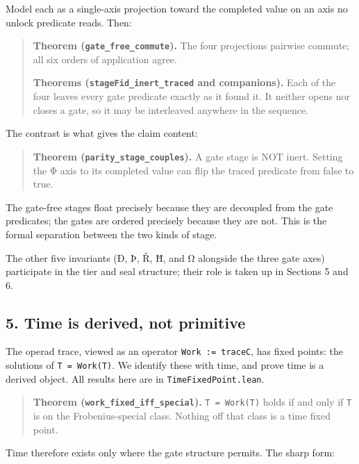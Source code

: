 Model each as a single-axis projection toward the completed value on an
axis no unlock predicate reads. Then:

\begin{quote}
\textbf{Theorem (\texttt{gate\_free\_commute}).} The four projections
pairwise commute; all six orders of application agree.

\textbf{Theorems (\texttt{stageFid\_inert\_traced} and companions).}
Each of the four leaves every gate predicate exactly as it found it. It
neither opens nor closes a gate, so it may be interleaved anywhere in
the sequence.
\end{quote}

The contrast is what gives the claim content:

\begin{quote}
\textbf{Theorem (\texttt{parity\_stage\_couples}).} A gate stage is NOT
inert. Setting the Φ axis to its completed value can flip the traced
predicate from false to true.
\end{quote}

The gate-free stages float precisely because they are decoupled from the
gate predicates; the gates are ordered precisely because they are not.
This is the formal separation between the two kinds of stage.

The other five invariants (Ð, Þ, Ř, Ħ, and Ω alongside the three gate
axes) participate in the tier and seal structure; their role is taken up
in Sections 5 and 6.

\hypertarget{time-is-derived-not-primitive}{%
\subsection{5. Time is derived, not
primitive}\label{time-is-derived-not-primitive}}

The operad trace, viewed as an operator \texttt{Work\ :=\ traceC}, has
fixed points: the solutions of \texttt{T\ =\ Work(T)}. We identify these
with time, and prove time is a derived object. All results here are in
\texttt{TimeFixedPoint.lean}.

\begin{quote}
\textbf{Theorem (\texttt{work\_fixed\_iff\_special}).}
\texttt{T\ =\ Work(T)} holds if and only if \texttt{T} is on the
Frobenius-special class. Nothing off that class is a time fixed point.
\end{quote}

Time therefore exists only where the gate structure permits. The sharp
form:

